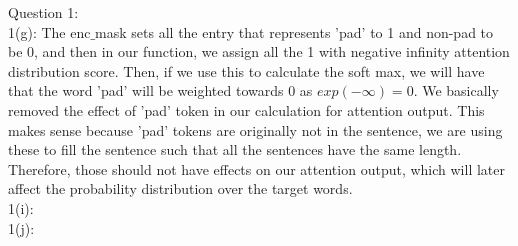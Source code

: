 \documentclass[11pt]{article}
\begin{document}
Question 1: \\
1(g): The enc$\_$mask sets all the entry that represents 'pad' to 1 and non-pad to be 0, and then in our function, we assign all the 1 with negative infinity attention distribution score. Then, if we use this to calculate the soft max, we will have that the word 'pad' will be weighted towards 0 as $exp(-\infty) = 0$. We basically removed the effect of 'pad' token in our calculation for attention output. This makes sense because 'pad' tokens are originally not in the sentence, we are using these to fill the sentence such that all the sentences have the same length. Therefore, those should not have effects on our attention output, which will later affect the probability distribution over the target words.  \\
1(i):  \\
1(j): 
\end{document}
